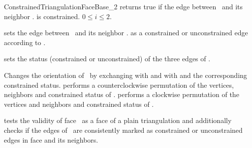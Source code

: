 \begin{ccRefConcept}{ConstrainedTriangulationFaceBase_2}
{returns true if the edge between \ccVar\ and its neighbor 
\ccVar . is constrained.
\ccPrecond $0\leq i \leq 2$.}

\begin{ccAdvanced}
\ccModifiers
{}
{sets the edge between \ccVar\ and its neighbor \ccVar .
 as a constrained or unconstrained edge according to .}

{sets the status (constrained or unconstrained) of the three
edges of \ccVar.}

{Changes the orientation of \ccVar\ by exchanging 
with  and  with 
and the corresponding constrained status.}
{performs a counterclockwise permutation of the
 vertices, neighbors and constrained status of  \ccVar.}
{performs a clockwise permutation of the
 vertices and neighbors and constrained status of \ccVar.}



{tests the validity of face  \ccVar\ 
as a face of a plain triangulation
and additionally checks
if the edges of \ccVar\ are consistently marked
as constrained or unconstrained edges
in face \ccVar and its neighbors.}
\end{ccAdvanced}



\ccHasModels



\ccSeeAlso
{} \\
 \\


\end{ccRefConcept}


